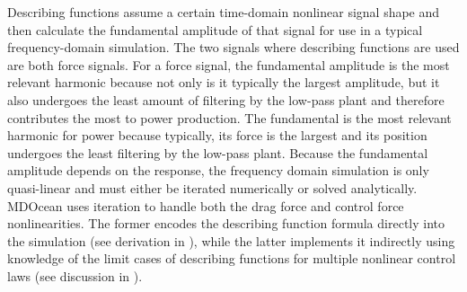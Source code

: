 Describing functions assume a certain time-domain nonlinear signal shape and then calculate the fundamental amplitude of that signal for use in a typical frequency-domain simulation.
\ifdefined\DISSERTATION
    The two signals where describing functions are used are both force signals.
    For a force signal, the fundamental amplitude is the most relevant harmonic because not only is it typically the largest amplitude, but it also undergoes the least amount of filtering by the low-pass plant and therefore contributes the most to power production.
\else
    The fundamental is the most relevant harmonic for power because typically, its force is the largest and its position undergoes the least filtering by the low-pass plant.
\fi
Because the fundamental amplitude depends on the response, the frequency domain simulation is only quasi-linear and must either be iterated numerically or solved analytically.
MDOcean uses iteration to handle both the drag force and control force nonlinearities. %
The former encodes the describing function formula directly into the simulation (see derivation in ), while the latter implements it indirectly using knowledge of the limit cases of describing functions for multiple nonlinear control laws (see discussion in ).

